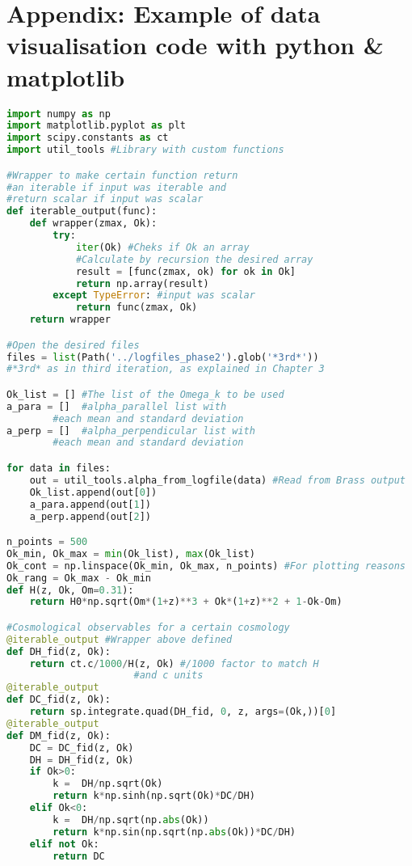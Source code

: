 \chapter*{Appendix: Example of data visualisation code with python \& matplotlib}

\renewcommand{\baselinestretch}{1}
\begin{lstlisting}[language=python]
import numpy as np
import matplotlib.pyplot as plt
import scipy.constants as ct
import util_tools #Library with custom functions

#Wrapper to make certain function return 
#an iterable if input was iterable and 
#return scalar if input was scalar
def iterable_output(func):
    def wrapper(zmax, Ok):
        try:
            iter(Ok) #Cheks if Ok an array
			#Calculate by recursion the desired array
			result = [func(zmax, ok) for ok in Ok] 
            return np.array(result)
        except TypeError: #input was scalar
            return func(zmax, Ok)
    return wrapper

#Open the desired files
files = list(Path('../logfiles_phase2').glob('*3rd*')) 
#*3rd* as in third iteration, as explained in Chapter 3

Ok_list = [] #The list of the Omega_k to be used
a_para = []  #alpha_parallel list with 
		#each mean and standard deviation
a_perp = []  #alpha_perpendicular list with 
		#each mean and standard deviation

for data in files:
    out = util_tools.alpha_from_logfile(data) #Read from Brass output
    Ok_list.append(out[0])
    a_para.append(out[1])
    a_perp.append(out[2])

n_points = 500
Ok_min, Ok_max = min(Ok_list), max(Ok_list)
Ok_cont = np.linspace(Ok_min, Ok_max, n_points) #For plotting reasons
Ok_rang = Ok_max - Ok_min
def H(z, Ok, Om=0.31):
    return H0*np.sqrt(Om*(1+z)**3 + Ok*(1+z)**2 + 1-Ok-Om)

#Cosmological observables for a certain cosmology
@iterable_output #Wrapper above defined
def DH_fid(z, Ok):
    return ct.c/1000/H(z, Ok) #/1000 factor to match H
    			      #and c units
@iterable_output
def DC_fid(z, Ok):
    return sp.integrate.quad(DH_fid, 0, z, args=(Ok,))[0]
@iterable_output
def DM_fid(z, Ok):
    DC = DC_fid(z, Ok)
    DH = DH_fid(z, Ok)
    if Ok>0:
        k =  DH/np.sqrt(Ok)
        return k*np.sinh(np.sqrt(Ok)*DC/DH)
    elif Ok<0:
        k =  DH/np.sqrt(np.abs(Ok))
        return k*np.sin(np.sqrt(np.abs(Ok))*DC/DH)
    elif not Ok:
        return DC


\end{lstlisting}
